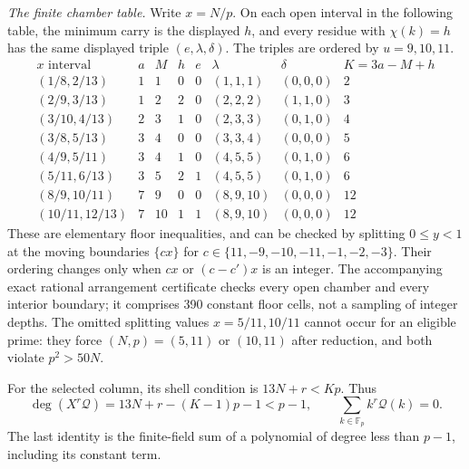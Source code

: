 \documentclass[11pt]{article}
\begin{document}
\emph{The finite chamber table.}
Write $x=N/p$. On each open interval in the following table, the
minimum carry is the displayed $h$, and every residue with
$\chi(k)=h$ has the same displayed triple $(e,\lambda,\delta)$.
The triples are ordered by $u=9,10,11$.
\[
\begin{array}{c|cc|c|c|c|c|c}
 x\text{ interval}&a&M&h&e&\lambda&\delta&K=3a-M+h\\\hline
(1/8,2/13)&1&1&0&0&(1,1,1)&(0,0,0)&2\\
(2/9,3/13)&1&2&2&0&(2,2,2)&(1,1,0)&3\\
(3/10,4/13)&2&3&1&0&(2,3,3)&(0,1,0)&4\\
(3/8,5/13)&3&4&0&0&(3,3,4)&(0,0,0)&5\\
(4/9,5/11)&3&4&1&0&(4,5,5)&(0,1,0)&6\\
(5/11,6/13)&3&5&2&1&(4,5,5)&(0,1,0)&6\\
(8/9,10/11)&7&9&0&0&(8,9,10)&(0,0,0)&12\\
(10/11,12/13)&7&10&1&1&(8,9,10)&(0,0,0)&12
\end{array}
\tag{T}
\]
These are elementary floor inequalities, and can be checked by splitting
$0\le y<1$ at the moving boundaries
$\{cx\}$ for
$c\in\{11,-9,-10,-11,-1,-2,-3\}$.
Their ordering changes only when $cx$ or $(c-c')x$ is an integer.
The accompanying exact rational arrangement certificate checks every
open chamber and every interior boundary; it comprises 390 constant
floor cells, not a sampling of integer depths.
The omitted splitting values $x=5/11,10/11$ cannot occur for an eligible
prime: they force $(N,p)=(5,11)$ or $(10,11)$ after reduction, and
both violate $p^2>50N$.

For the selected column, its shell condition is $13N+r<Kp$.
Thus
\[
 \deg(X^r\mathcal Q)=13N+r-(K-1)p-1<p-1,
 \qquad\sum_{k\in\mathbb F_p}k^r\mathcal Q(k)=0.
 \tag{V}
\]
The last identity is the finite-field sum of a polynomial of degree
less than $p-1$, including its constant term.
\end{document}
